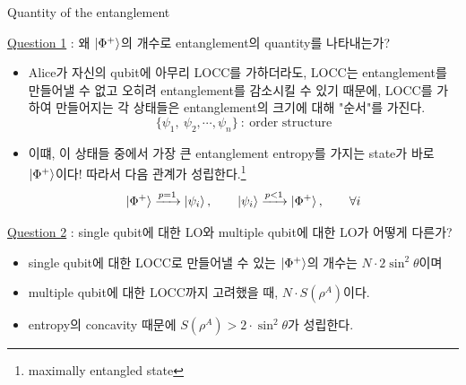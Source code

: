 \documentclass[9pt]{beamer}
\begin{document}
\begin{section}{Quantity of the entanglement}
\begin{frame}
            \underline{Question 1} : 왜 $\ket{\Phi^+}$의 개수로 entanglement의 quantity를 나타내는가?
            \begin{itemize}
                \item Alice가 자신의 qubit에 아무리 LOCC를 가하더라도, LOCC는 entanglement를 만들어낼 수 없고 오히려 entanglement를 감소시킬 수 있기 때문에, LOCC를 가하여 만들어지는 각 상태들은 entanglement의 크기에 대해 "순서"를 가진다.
                \begin{equation*}
                    \{\psi_1, \ \psi_2, \cdots, \psi_n \} \ : \ \text{order structure}
                \end{equation*}
                \item 이떄, 이 상태들 중에서 가장 큰 entanglement entropy를 가지는 state가 바로 $\ket{\Phi^+}$이다! 따라서 다음 관계가 성립한다.\footnote{maximally entangled state}
                \begin{equation*}
                    \ket{\Phi^+} \xrightarrow{p=1} \ket{\psi_i}, \qquad \ket{\psi_i} \xrightarrow{p<1} \ket{\Phi^+},\qquad \forall i
                \end{equation*}
            \end{itemize}
            \vspace{0.2cm}
            \underline{Question 2} : single qubit에 대한 LO와 multiple qubit에 대한 LO가 어떻게 다른가?
            \begin{itemize}
                \item single qubit에 대한 LOCC로 만들어낼 수 있는 $\ket{\Phi^+}$의 개수는 $N \cdot 2 \sin^2 \theta$이며
                \item multiple qubit에 대한 LOCC까지 고려했을 때, $N \cdot S(\rho^A)$이다.
                \item entropy의 concavity 때문에 $S(\rho^A) > 2\cdot \sin^2 \theta$가 성립한다.
            \end{itemize}
        \end{frame}


\end{section}
\end{document}
